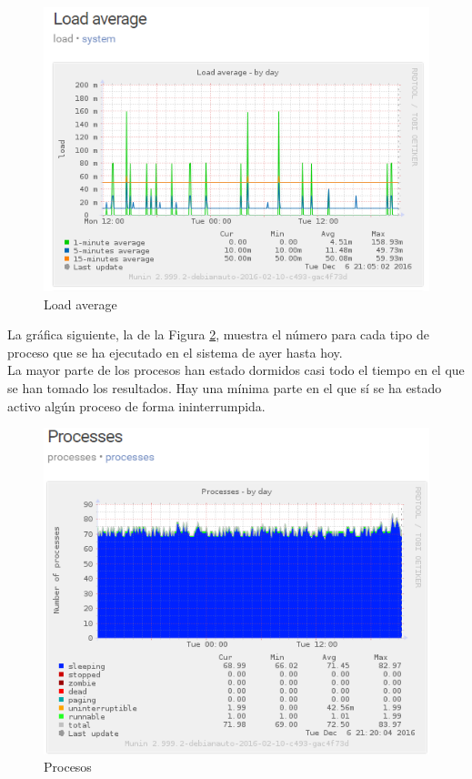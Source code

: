 \begin{figure}[H]
	\centering
	\includegraphics[scale=1]{figuras/ejercicio6/figura3.png} 
	\caption{Load average \cite{enlace6}} 
	\label{fig:figura63}
\end{figure}

La gráfica siguiente, la de la Figura \ref{fig:figura64}, muestra el número para cada tipo de proceso que se ha ejecutado en el sistema de ayer hasta hoy.
\\

La mayor parte de los procesos han estado dormidos casi todo el tiempo en el que se han tomado los resultados. Hay una mínima parte en el que sí se ha estado activo algún proceso de forma ininterrumpida.

\begin{figure}[H]
	\centering
	\includegraphics[scale=1]{figuras/ejercicio6/figura4.png} 
	\caption{Procesos \cite{enlace7}} 
	\label{fig:figura64}
\end{figure}

